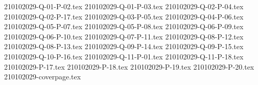 \documentclass{article}                              %
\begin{document}
{210102029-Q-01-P-02.tex}
{210102029-Q-01-P-03.tex}
{210102029-Q-02-P-04.tex}
{210102029-Q-02-P-17.tex}
{210102029-Q-03-P-05.tex}
{210102029-Q-04-P-06.tex}
{210102029-Q-05-P-07.tex}
{210102029-Q-05-P-08.tex}
{210102029-Q-06-P-09.tex}
{210102029-Q-06-P-10.tex}
{210102029-Q-07-P-11.tex}
{210102029-Q-08-P-12.tex}
{210102029-Q-08-P-13.tex}
{210102029-Q-09-P-14.tex}
{210102029-Q-09-P-15.tex}
{210102029-Q-10-P-16.tex}
{210102029-Q-11-P-01.tex}
{210102029-Q-11-P-18.tex}
{210102029-P-17.tex}
{210102029-P-18.tex}
{210102029-P-19.tex}
{210102029-P-20.tex}
{210102029-coverpage.tex}
\end{document}
